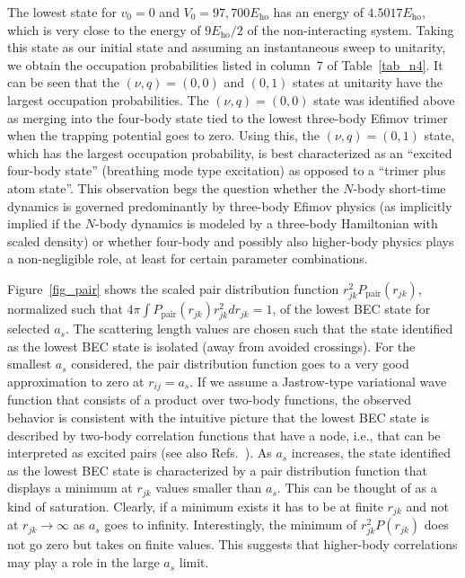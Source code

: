 \documentclass[aps,pra,twocolumn,showpacs,superscriptaddress]{revtex4}
\begin{document}
The lowest state for $v_0=0$ and $V_0=97,700 E_{\text{ho}}$
has an energy of $4.5017 E_{\text{ho}}$, which is very close to the 
energy of $9 E_{\text{ho}}/2$ of the non-interacting system. Taking this
state as our initial state and assuming an instantaneous sweep
to unitarity, we obtain the occupation probabilities listed in 
column~7 of Table~\ref{tab_n4}.
It can be seen that the $(\nu,q)=(0,0)$ and $(0,1)$
states at unitarity 
have the largest occupation probabilities.
The $(\nu,q)=(0,0)$ state was identified
above as merging into the four-body
state tied to the lowest three-body Efimov trimer when the trapping potential
goes to zero.
Using this, the $(\nu,q)=(0,1)$ 
state, which has the largest occupation probability, 
is best characterized as an ``excited four-body
state'' (breathing mode type excitation)
as opposed to a ``trimer plus atom state''.
This observation begs the question whether the $N$-body 
short-time dynamics is
governed predominantly by three-body Efimov physics (as implicitly
implied if the $N$-body dynamics is modeled by a
three-body Hamiltonian with scaled density)
or whether four-body and possibly also higher-body physics
plays a non-negligible role,
at least for certain parameter combinations.




Figure~\ref{fig_pair} shows the
scaled pair distribution function
$r_{jk}^2 P_{\text{pair}}(r_{jk})$,
normalized such that $4 \pi \int P_{\text{pair}}(r_{jk}) r_{jk}^2 d r_{jk}=1$,
of the lowest BEC state for
selected $a_s$.
The scattering length values are chosen
such that the state identified as the lowest
BEC state is isolated (away from avoided crossings).
For the smallest $a_s$ considered, the pair distribution
function
goes to a very good approximation to zero
at $r_{ij}=a_s$.
If we assume a Jastrow-type
variational wave function that consists of a product over two-body
functions,
the observed behavior is consistent with the intuitive
picture that the lowest BEC state is described
by two-body correlation functions that have a node, i.e., that
can be interpreted as excited pairs
(see also Refs.~\cite{ancilotto2015,sze2017}).
As $a_s$ increases, the
state identified as the lowest BEC state 
is characterized by a pair distribution function
that displays a minimum at $r_{jk}$ values smaller than $a_s$.
This can be thought of as a kind of saturation.
Clearly, if a minimum exists it has to be at finite $r_{jk}$ and not
at $r_{jk} \rightarrow \infty$
as
$a_s$ goes to infinity.
Interestingly, the minimum of $r_{jk}^2P(r_{jk})$ does not
go zero but takes on finite values.
This suggests that
higher-body correlations may play a role in the large $a_s$ limit.
\end{document}
